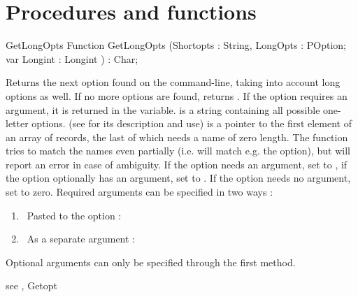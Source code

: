 \section {Procedures and functions}
\begin{function}{GetLongOpts}
\Declaration
Function GetLongOpts (Shortopts : String, LongOpts : POption; var Longint
: Longint ) : Char;

\Description

Returns the next option found on the command-line, taking into account long
options as well. If no more options are
found, returns . If the option requires an argument, it is
returned in the  variable.
 is a string containing all possible one-letter options.
(see  for its description and use)
 is a pointer to the first element of an array of  
records, the last of which needs a name of zero length.  
The function tries to match the names even partially (i.e.  
will match e.g. the  option), but will report an error in case of
ambiguity.
If the option needs an argument, set  to
, if the option optionally has an argument, set
 to . If the option needs no argument,
set  to zero.
Required arguments can be specified in two ways : 
\begin{enumerate}
\item \ Pasted to the option : 
\item \ As a separate argument : 
\end{enumerate}
Optional arguments can only be specified through the first method.

\Errors
 see , 
\SeeAlso
Getopt
\end{function}
